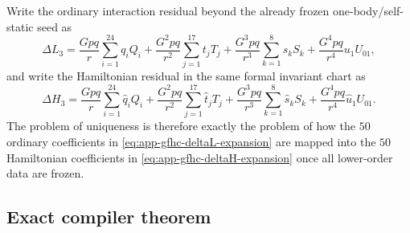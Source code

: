 \documentclass[11pt]{article}
\begin{document}
Write the ordinary interaction residual beyond the already frozen one-body/self-
static seed as
\begin{equation}
\Delta L_3
=
\frac{Gpq}{r}\sum_{i=1}^{24} q_i Q_i
+\frac{G^2pq}{r^2}\sum_{j=1}^{17} t_j T_j
+\frac{G^3pq}{r^3}\sum_{k=1}^{8} s_k S_k
+\frac{G^4pq}{r^4}u_1 U_{01},
\label{eq:app-gfhc-deltaL-expansion}
\end{equation}
and write the Hamiltonian residual in the same formal invariant chart as
\begin{equation}
\Delta H_3
=
\frac{Gpq}{r}\sum_{i=1}^{24} \hat q_i Q_i
+\frac{G^2pq}{r^2}\sum_{j=1}^{17} \hat t_j T_j
+\frac{G^3pq}{r^3}\sum_{k=1}^{8} \hat s_k S_k
+\frac{G^4pq}{r^4}\hat u_1 U_{01}.
\label{eq:app-gfhc-deltaH-expansion}
\end{equation}
The problem of uniqueness is therefore exactly the problem of how the $50$
ordinary coefficients in \eqref{eq:app-gfhc-deltaL-expansion} are mapped into
the $50$ Hamiltonian coefficients in \eqref{eq:app-gfhc-deltaH-expansion} once
all lower-order data are frozen.

\subsection{Exact compiler theorem}
\label{app:generic-frame-hamiltonian-compiler-uniqueness-theorem}
\end{document}
